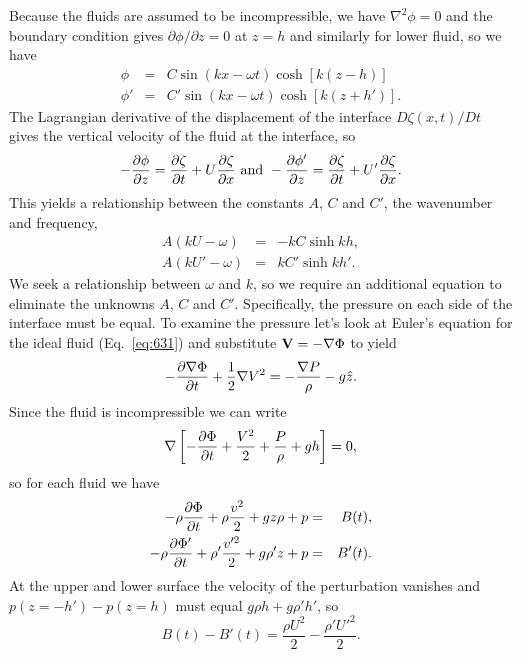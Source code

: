 Because the fluids are assumed to be incompressible, we have $\nabla^2
\phi=0$ and the boundary condition gives $\partial \phi/\partial z=0$
at $z=h$ and similarly for lower fluid, so we have 
\begin{eqnarray}
\phi &=& C \sin \left (k x - \omega t\right ) \cosh \left [ k(z-h)
\right ] \\
\phi' &=& C' \sin \left (k x - \omega t\right ) \cosh \left [ k(z+h')
\right ]. 
\end{eqnarray}
The Lagrangian derivative of the displacement of the interface
$D \zeta(x,t)/Dt$ gives the vertical velocity of the fluid at the
interface, so
\begin{equation}
-\frac{\partial {\phi}}{\partial {z}} = \frac{\partial {\zeta}}{\partial {t}} + U \frac{\partial {\zeta}}{\partial {x}}~\mathrm{and}~
-\frac{\partial {\phi'}}{\partial {z}} = \frac{\partial {\zeta}}{\partial {t}} + U' \frac{\partial {\zeta}}{\partial {x}}.
\end{equation}
This yields a relationship between the constants $A$, $C$ and $C'$,
the wavenumber and frequency,
\begin{eqnarray}
A \left ( k U - \omega \right ) &=& - k C \sinh k h, 
\label{eq:868}
\\
A \left ( k U' - \omega \right ) &=&  k C' \sinh k h'.
\label{eq:869}
\end{eqnarray}
We seek a relationship between $\omega$ and $k$, so we require an
additional equation to eliminate the unknowns $A$, $C$ and $C'$.
Specifically, the pressure on each side of the interface must be
equal.  To examine the pressure let's look at Euler's equation
for the ideal fluid (Eq.~\ref{eq:631}) and substitute ${\bf V}=-\nabla
\Phi$ to yield
\begin{equation}
-\frac{\partial {\nabla \Phi}}{\partial {t}} + \frac{1}{2} \nabla V^2 = -\frac{\nabla P}{\rho}
- g {\hat z}.
\end{equation}
Since the fluid is incompressible we can write
\begin{equation}
\nabla \left [ -\frac{\partial {\Phi}}{\partial {t}} + \frac{V^2}{2} + \frac{P}{\rho} + g h
\right ] = 0,
\end{equation}
so for each fluid we have
\begin{eqnarray}
-\rho \frac{\partial {\Phi}}{\partial {t}} + \rho \frac{v^2}{2} + g z \rho + p &=& B(t), \\
-\rho \frac{\partial {\Phi'}}{\partial {t}} + \rho' \frac{v'^2}{2} + g \rho' z + p &=& B'(t).
\end{eqnarray}
At the upper and lower surface the velocity of the perturbation
vanishes and $p(z=-h')-p(z=h)$ must equal $g \rho h + g \rho' h'$, so
\begin{equation}
B(t) - B'(t) = \frac{\rho U^2}{2} - \frac{\rho' U'^2}{2}.
\end{equation} 
